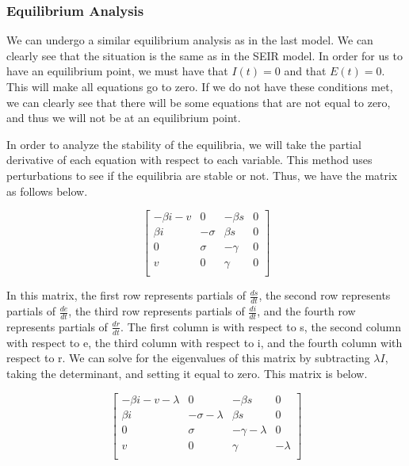 \documentclass[12pt, a4paper]{article}
\begin{document}
        \subsubsection{Equilibrium Analysis}
        
        We can undergo a similar equilibrium analysis as in the last model. We can clearly see that the situation is the same as in the SEIR model. In order for us to have an equilibrium point, we must have that $I(t)=0$ and that $E(t)=0$. This will make all equations go to zero. If we do not have these conditions met, we can clearly see that there will be some equations that are not equal to zero, and thus we will not be at an equilibrium point.
        
        In order to analyze the stability of the equilibria, we will take the partial derivative of each equation with respect to each variable. This method uses perturbations to see if the equilibria are stable or not. Thus, we have the matrix as follows below.
        
        $$\begin{bmatrix}
            -\beta i - v & 0 & -\beta s & 0 \\
            \beta i & -\sigma & \beta s & 0 \\
            0 & \sigma & -\gamma & 0 \\
            v & 0 & \gamma & 0 \\
        \end{bmatrix}$$
    
        In this matrix, the first row represents partials of $\frac{ds}{dt}$, the second row represents partials of $\frac{de}{dt}$, the third row represents partials of $\frac{di}{dt}$, and the fourth row represents partials of $\frac{dr}{dt}$. The first column is with respect to s, the second column with respect to e, the third column with respect to i, and the fourth column with respect to r. We can solve for the eigenvalues of this matrix by subtracting $\lambda I$, taking the determinant, and setting it equal to zero. This matrix is below.
        
        $$\begin{bmatrix}
            -\beta i - v -\lambda & 0 & -\beta s & 0 \\
            \beta i & -\sigma -\lambda & \beta s & 0 \\
            0 & \sigma & -\gamma -\lambda & 0 \\
            v & 0 & \gamma & -\lambda \\
        \end{bmatrix}$$
        
\end{document}

